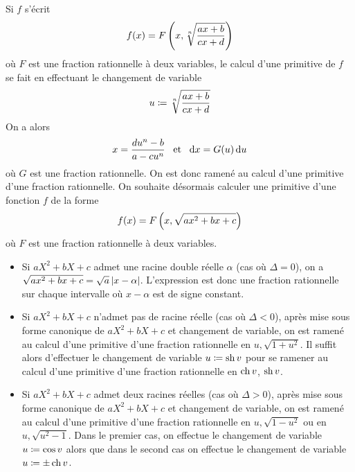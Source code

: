 \documentclass{magnolia}
\begin{document}
\begin{remarques}
\remarque Si $f$ s'écrit
  \[f(x)=F\left(x,\sqrt[n]{\frac{ax+b}{cx+d}}\right)\]
  où $F$ est une fraction rationnelle à deux variables, le calcul d'une
  primitive de $f$ se fait en effectuant le changement de variable
  \[u\coloneqq\sqrt[n]{\frac{ax+b}{cx+d}}\]
  On a alors
  \[x=\frac{du^n-b}{a-cu^n} \quad\!\text{et}\quad\! \text{d}x=G(u)\,\text{d}u\]
  où $G$ est une fraction rationnelle. On est donc ramené au calcul d'une
  primitive d'une fraction rationnelle.
\remarque On souhaite désormais calculer une primitive d'une fonction $f$ de la forme
  \[f(x)=F\left(x,\sqrt{ax^2+bx+c}\right)\]
  où $F$ est une fraction rationnelle à deux variables.
  \begin{itemize}
  \item Si $aX^2+bX+c$ admet une racine double réelle $\alpha$ (cas où $\Delta=0$), on
    a $\sqrt{ax^2+bx+c}=\sqrt{a}\left|x-\alpha\right|$. L'expression est donc
    une fraction rationnelle sur chaque intervalle où $x-\alpha$ est de signe
    constant.
  \item Si $aX^2+bX+c$ n'admet pas de racine réelle (cas où $\Delta<0$), après
    mise sous forme canonique de $aX^2+bX+c$ et changement de variable, on
    est ramené au calcul d'une primitive d'une fraction rationnelle
    en $u,\sqrt{1+u^2}$. Il suffit alors d'effectuer le changement de variable
    $u\coloneqq\operatorname{sh} v$ pour se ramener au calcul d'une primitive d'une fraction
    rationnelle en $\operatorname{ch} v$, $\operatorname{sh} v$.
  \item Si $aX^2+bX+c$ admet deux racines réelles (cas où $\Delta>0$), après
    mise sous forme canonique de $aX^2+bX+c$ et changement de variable, on
    est ramené au calcul d'une primitive d'une fraction rationnelle
    en $u,\sqrt{1-u^2}$ ou en $u,\sqrt{u^2-1}$. Dans le premier cas, on
    effectue le changement de variable $u\coloneqq\cos v$ alors que dans le second
    cas on effectue le changement de variable $u\coloneqq\pm\operatorname{ch} v$.
  \end{itemize}
\end{remarques}
\end{document}

